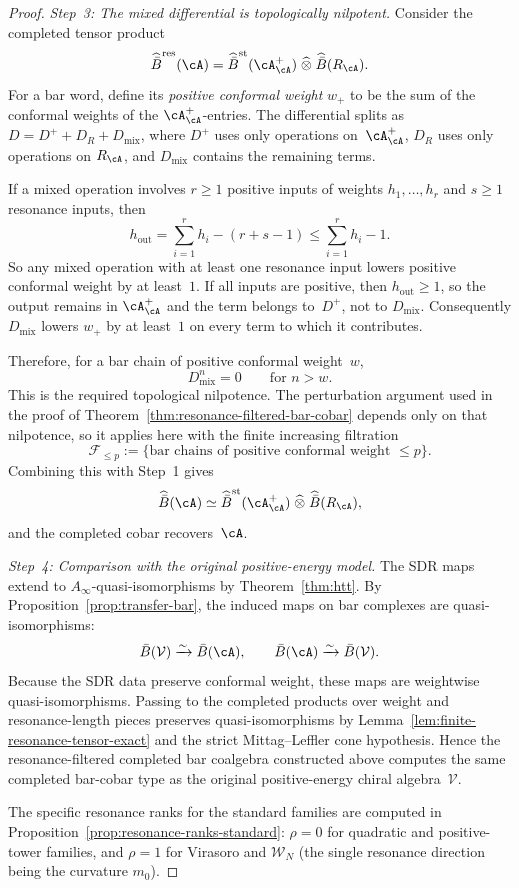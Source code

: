 \begin{proof}
\emph{Step~3: The mixed differential is topologically nilpotent.}
Consider the completed tensor product
\[
\widehat{\bar B}^{\mathrm{res}}(\cA)
=
\widehat{\bar B}^{\mathrm{st}}(\cA^+_\cA)
\;\widehat{\otimes}\;
\widehat{\bar B}(R_\cA).
\]
For a bar word, define its \emph{positive conformal weight}
$w_+$ to be the sum of the conformal weights of the
$\cA^+_\cA$-entries. The differential splits as
$D = D^+ + D_R + D_{\mathrm{mix}}$, where $D^+$ uses only
operations on~$\cA^+_\cA$, $D_R$ uses only operations on
$R_\cA$, and $D_{\mathrm{mix}}$ contains the remaining terms.

If a mixed operation involves $r \ge 1$ positive inputs of
weights $h_1, \ldots, h_r$ and $s \ge 1$ resonance inputs, then
\[
h_{\mathrm{out}}
=
\sum_{i=1}^r h_i - (r+s-1)
\le
\sum_{i=1}^r h_i - 1.
\]
So any mixed operation with at least one resonance input lowers
positive conformal weight by at least~$1$. If all inputs are
positive, then $h_{\mathrm{out}} \ge 1$, so the output remains in
$\cA^+_\cA$ and the term belongs to~$D^+$, not to
$D_{\mathrm{mix}}$. Consequently
$D_{\mathrm{mix}}$ lowers $w_+$ by at least~$1$ on every term to
which it contributes.

Therefore, for a bar chain of positive conformal weight~$w$,
\[
D_{\mathrm{mix}}^n = 0
\qquad\text{for } n > w.
\]
This is the required topological nilpotence. The perturbation
argument used in the proof of
Theorem~\ref{thm:resonance-filtered-bar-cobar} depends only on
that nilpotence, so it applies here with the finite increasing
filtration
\[
\mathcal F_{\le p}
:=
\{\text{bar chains of positive conformal weight } \le p\}.
\]
Combining this with Step~1 gives
\[
\widehat{\bar B}(\cA)
\simeq
\widehat{\bar B}^{\mathrm{st}}(\cA^+_\cA)
\;\widehat{\otimes}\;
\widehat{\bar B}(R_\cA),
\]
and the completed cobar recovers~$\cA$.

\emph{Step~4: Comparison with the original positive-energy model.}
The SDR maps extend to $A_\infty$-quasi-isomorphisms by
Theorem~\ref{thm:htt}. By
Proposition~\ref{prop:transfer-bar}, the induced maps on bar
complexes are quasi-isomorphisms:
\[
\bar B(\mathcal V) \xrightarrow{\sim} \bar B(\cA),
\qquad
\bar B(\cA) \xrightarrow{\sim} \bar B(\mathcal V).
\]
Because the SDR data preserve conformal weight, these maps are
weightwise quasi-isomorphisms.  Passing to the completed products over
weight and resonance-length pieces preserves quasi-isomorphisms by
Lemma~\ref{lem:finite-resonance-tensor-exact} and the strict
Mittag--Leffler cone hypothesis. Hence the resonance-filtered
completed bar coalgebra constructed above computes the same completed
bar-cobar type as the original positive-energy chiral
algebra~$\mathcal V$.

The specific resonance ranks for the standard families are
computed in Proposition~\ref{prop:resonance-ranks-standard}:
$\rho = 0$ for quadratic and positive-tower families, and
$\rho = 1$ for Virasoro and $\mathcal{W}_N$
\textup{(}the single resonance direction being the
curvature $m_0$\textup{)}.
\end{proof}

